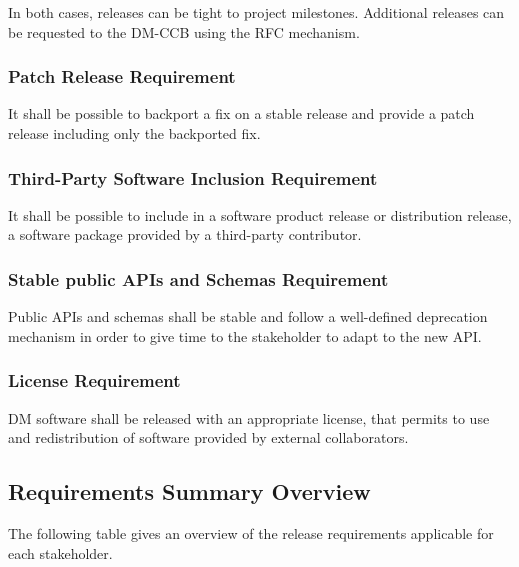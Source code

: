 In both cases, releases can be tight to project milestones.
Additional releases can be requested to the DM-CCB using the RFC mechanism.


\subsubsection{Patch Release Requirement} \label{sec:backport}

It shall be possible to backport a fix on a stable release and provide a patch release including only the backported fix.


\subsubsection{Third-Party Software Inclusion Requirement} \label{sec:thirdsw}

It shall be possible to include in a software product release or distribution release, a software package provided by a third-party contributor.


\subsubsection{Stable public APIs and Schemas Requirement} \label{sec:stable}

Public APIs and schemas shall be stable and follow a well-defined deprecation mechanism in order to give time to the stakeholder to adapt to the new API.


\subsubsection{License Requirement} \label{sec:license}

DM software shall be released with an appropriate license, that permits to use and redistribution of software provided by external collaborators.


\subsection{Requirements Summary Overview} \label{sec:overview}

The following table gives an overview of the release requirements applicable for each stakeholder.

